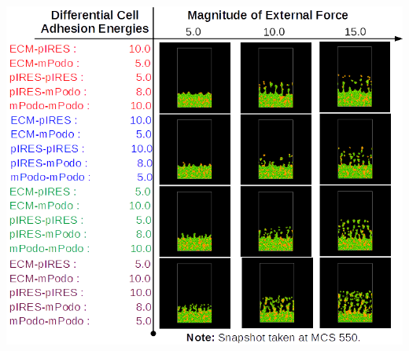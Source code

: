\documentclass[landscape,a0paper,fontscale=0.292]{baposter}
\begin{document}
\begin{poster}
{\includegraphics[scale=0.38]{res4}
\hspace{0.1cm}
}
\end{poster}
\end{document}

